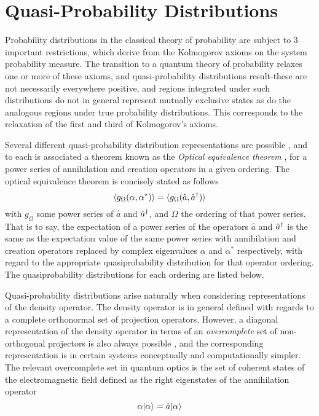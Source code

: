\section{Quasi-Probability Distributions}
Probability distributions in the classical theory of probability are subject to 3 important restrictions, which derive from the Kolmogorov axioms on the system probability measure.
The transition to a quantum theory of probability relaxes one or more of these axioms, and quasi-probability distributions result-these are not necessarily everywhere positive, and regions integrated under such distributions do not in general represent mutually exclusive states as do the analogous regions under true probability distributions.
This corresponds to the relaxation of the first and third of Kolmogorov's axioms.

Several different quasi-probability distribution representations are possible \cite{Walls2008}, and to each is associated a theorem known as the \emph{Optical equivalence theorem} \cite{Sudarshan1963}, for a power series of annihilation and creation operators in a given ordering.
The optical equivalence theorem is concisely stated as follows
\begin{equation}
	\langle g_{\Omega} (\alpha, \alpha^*) \rangle = \langle g_{\Omega} (\hat{a}, {\hat{a}^\dagger}) \rangle
\end{equation}
with $g_\Omega$ some power series of $\hat{a}$ and ${\hat{a}^\dagger}$, and $\Omega$ the ordering of that power series.
That is to say, the expectation of a power series of the operators $\hat{a}$ and ${\hat{a}^\dagger}$ is the same as the expectation value of the same power series with annihilation and creation operators replaced by complex eigenvalues $\alpha$ and $\alpha^*$ respectively, with regard to the appropriate quasiprobability distribution for that operator ordering.
The quasiprobability distributions for each ordering are listed below.

Quasi-probability distributions arise naturally when considering representations of the density operator.
The density operator is in general defined with regards to a complete orthonormal set of projection operators.
However, a diagonal representation of the density operator in terms of an \emph{overcomplete} set of non-orthogonal projectors is also always possible \cite{Sudarshan1963}, and the corresponding representation is in certain systems conceptually and computationally simpler.
The relevant overcomplete set in quantum optics is the set of coherent states of the electromagnetic field defined as the right eigenstates of the annihilation operator
\begin{equation}
\alpha | \alpha \rangle = \hat{a} | \alpha \rangle
\end{equation}
